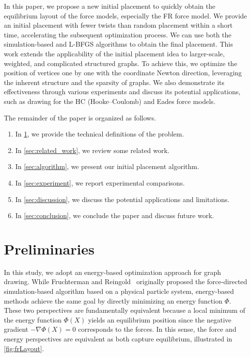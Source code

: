 \documentclass{jgaa-art}
\begin{document}
In this paper, we propose a new initial placement to quickly obtain the equilibrium layout of the force models, especially the FR force model.
We provide an initial placement with fewer twists than random placement within a short time, accelerating the subsequent optimization process.
We can use both the simulation-based and L-BFGS algorithms to obtain the final placement.
This work extends the applicability of the initial placement idea to larger-scale, weighted, and complicated structured graphs.
To achieve this, we optimize the position of vertices one by one with the coordinate Newton direction, leveraging the inherent structure and the sparsity of graphs.
We also demonstrate its effectiveness through various experiments and discuss its potential applications, such as drawing for the HC (Hooke--Coulomb) \citep{atallahAlgorithmsTheoryComputation2009} and Eades \citep{eades1984heuristic} force models.

The remainder of the paper is organized as follows.
\begin{enumerate}[label=\textbullet, itemsep=0pt, parsep=0pt]
  \item In \cref{sec:preliminaries}, we provide the technical definitions of the problem.

  \item In \cref{sec:related_work}, we review some related work.

  \item In \cref{sec:algorithm}, we present our initial placement algorithm.

  \item In \cref{sec:experiment}, we report experimental comparisons.

  \item In \cref{sec:discussion}, we discuss the potential applications and limitations.

  \item In \cref{sec:conclusion}, we conclude the paper and discuss future work.
\end{enumerate}

\section{Preliminaries}
\label{sec:preliminaries}

In this study, we adopt an energy-based optimization approach for graph drawing.
While Fruchterman and Reingold~\citep{fruchtermanGraphDrawingForcedirected1991} originally proposed the force-directed simulation-based algorithm based on a physical particle system, energy-based methods achieve the same goal by directly minimizing an energy function $\Phi$.
These two perspectives are fundamentally equivalent because a local minimum of the energy function $\Phi(X)$ yields an equilibrium position since the negative gradient $-\nabla \Phi(X) = 0$ corresponds to the forces.
In this sense, the force and energy perspectives are equivalent as both capture equilibrium, illustrated in \cref{fig:frLayout}.
\end{document}
